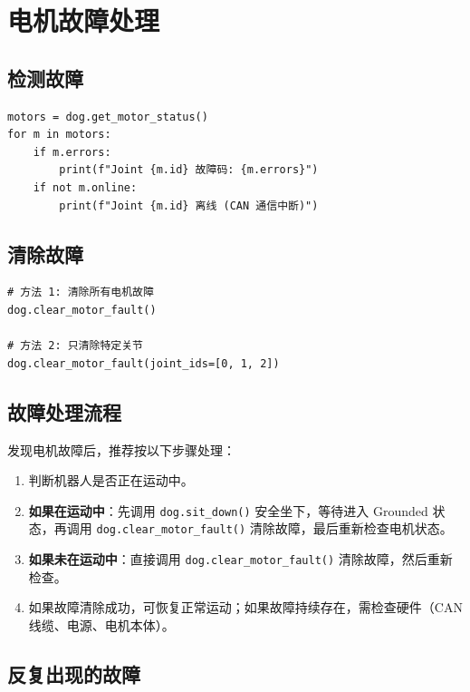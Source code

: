 \documentclass[a4paper,11pt,openany]{book}
\begin{document}
\section{电机故障处理}

\subsection{检测故障}

\begin{lstlisting}[style=python]
motors = dog.get_motor_status()
for m in motors:
    if m.errors:
        print(f"Joint {m.id} 故障码: {m.errors}")
    if not m.online:
        print(f"Joint {m.id} 离线 (CAN 通信中断)")
\end{lstlisting}

\subsection{清除故障}

\begin{lstlisting}[style=python]
# 方法 1: 清除所有电机故障
dog.clear_motor_fault()

# 方法 2: 只清除特定关节
dog.clear_motor_fault(joint_ids=[0, 1, 2])
\end{lstlisting}

\subsection{故障处理流程}

发现电机故障后，推荐按以下步骤处理：

\begin{enumerate}[nosep]
  \item 判断机器人是否正在运动中。
  \item \textbf{如果在运动中}：先调用 \texttt{dog.sit\_down()} 安全坐下，等待进入 Grounded 状态，再调用 \texttt{dog.clear\_motor\_fault()} 清除故障，最后重新检查电机状态。
  \item \textbf{如果未在运动中}：直接调用 \texttt{dog.clear\_motor\_fault()} 清除故障，然后重新检查。
  \item 如果故障清除成功，可恢复正常运动；如果故障持续存在，需检查硬件（CAN 线缆、电源、电机本体）。
\end{enumerate}

\subsection{反复出现的故障}
\end{document}
